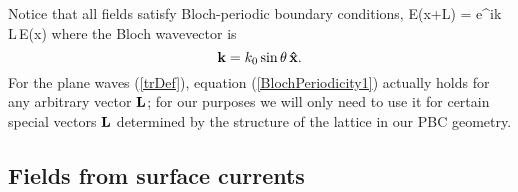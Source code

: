 \documentclass[letterpaper]{article}
\begin{document}
Notice that all fields satisfy Bloch-periodic boundary conditions,
{\vb E(\vb x+\vb L) = e^{i\vb k \cdot \vb L}\,\vb E(\vb x)}
where the Bloch wavevector is 
$$\mathbf{k}=k_0 \sin\theta \, \mathbf{\hat x}.$$
For the plane waves (\ref{trDef}), equation (\ref{BlochPeriodicity1})
actually holds for any arbitrary vector $\mathbf{L}$; for our 
purposes we will only need to use it for certain special
vectors $\mathbf{L}$ determined by the structure of the lattice in
our PBC geometry.

\subsection*{Fields from surface currents}
\end{document}

